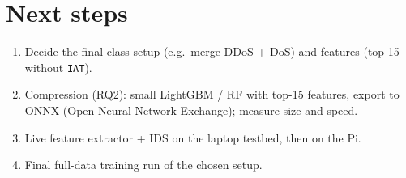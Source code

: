\documentclass[11pt]{article}
\begin{document}
\section{Next steps}
\begin{enumerate}
\item Decide the final class setup (e.g.\ merge DDoS + DoS) and features (top 15 without \texttt{IAT}).
\item Compression (RQ2): small LightGBM / RF with top-15 features, export to ONNX (Open Neural Network Exchange); measure size and speed.
\item Live feature extractor + IDS on the laptop testbed, then on the Pi.
\item Final full-data training run of the chosen setup.
\end{enumerate}
\end{document}
